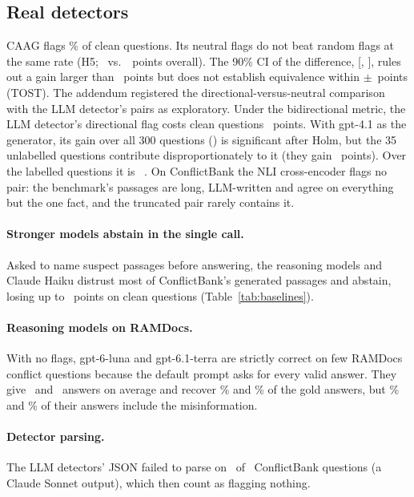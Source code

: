 \subsection{Real detectors}
CAAG flags \cleanFprCaag\% of clean questions. Its neutral flags do not beat random flags at the same rate (H5;
\dCaagFlagAll\ vs.\ \dRandFlagAll\ points overall). The 90\% CI of the difference, [\tostLo, \tostHi], rules out a
gain larger than \tostHi\ points but does not establish equivalence within $\pm$\tostMargin\ points (TOST). The
addendum registered the directional-versus-neutral comparison with the LLM detector's pairs as exploratory.
Under the bidirectional metric, the LLM detector's directional flag costs clean questions \arLlmDirClean\ points. With
gpt-4.1 as the generator, its gain over all 300 questions (\gptLlmDirAll) is significant after Holm, but the 35
unlabelled questions contribute disproportionately to it (they gain \agptexclLlmDir\ points). Over the labelled
questions it is \gptlabLlmDir\ \gptlabLlmDirCI. On ConflictBank the NLI cross-encoder flags no pair:
the benchmark's passages are long, LLM-written and agree on everything but the one fact, and the truncated pair rarely
contains it.

\paragraph{Stronger models abstain in the single call.} Asked to name suspect passages before answering, the reasoning
models and Claude Haiku distrust most of ConflictBank's generated passages and abstain, losing up to
\azSgTerraSelfIdentifyClean\ points on clean questions (Table~\ref{tab:baselines}).

\paragraph{Reasoning models on RAMDocs.} With no flags, gpt-6-luna and gpt-6.1-terra are
strictly correct on few RAMDocs conflict questions because the default prompt asks for every valid answer. They give
\mixRdLunaNAnswers\ and \mixRdTerraNAnswers\ answers on average and recover \mixRdLunaRecall\% and
\mixRdTerraRecall\% of the gold answers, but \mixRdLunaMisinfo\% and \mixRdTerraMisinfo\% of their answers include
the misinformation.

\paragraph{Detector parsing.} The LLM detectors' JSON failed to parse on \parseFailTotal\ of \parseFailN\ ConflictBank
questions (a Claude Sonnet output), which then count as flagging nothing.

